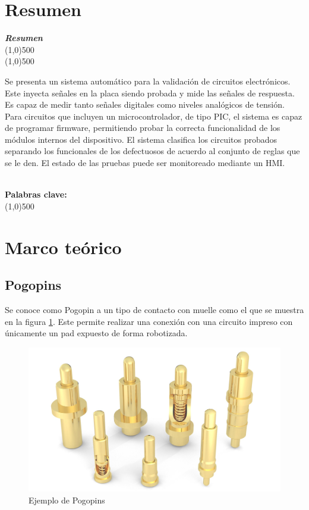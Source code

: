 \documentclass[12pt,letterpaper]{article}     %
\makeatletter
\newcounter{resumen}
\newenvironment{resumen}
{	
	\begin{center}
	\begin{minipage}[t]{500 pt}
	\vspace{5mm}
	\emph{\textbf{Resumen}}
	\\[-2mm]
	\line(1,0){500}
	\\[-4.25 mm]
	\line(1,0){500}
	\vspace{\baselineskip}
}
{
	\normalsize
	\\[2mm]
	\footnotesize\textbf{Palabras clave: \footnotesize\@palabras}
	\\[-2mm]
	\line(1,0){500}
	\\[0.5cm]
	\end{minipage}
	\end{center}
}
\makeatother
\begin{document}
\newpage
\section{Resumen}
\begin{resumen}
	Se presenta un sistema automático para la validación de circuitos electrónicos.
	Este inyecta señales en la placa siendo probada y mide las señales de respuesta.
	Es capaz de medir tanto señales digitales como niveles analógicos de tensión.
	Para circuitos que incluyen un microcontrolador, de tipo PIC, el sistema es capaz de programar
	firmware, permitiendo probar la correcta funcionalidad de los módulos internos
	del dispositivo. El sistema clasifica los circuitos probados separando los
	funcionales de los defectuosos de acuerdo al conjunto de reglas que se le den.
	El estado de las pruebas puede ser monitoreado mediante un HMI.
\end{resumen} 
% 
\section{Marco teórico}
\label{Marco teórico}

\subsection{Pogopins}

Se conoce como Pogopin a un tipo de contacto con muelle como el que se muestra en la figura \ref{fig:pogopin}.
Este permite realizar una conexión con una circuito impreso con únicamente un pad expuesto de forma robotizada.

\begin{figure}[!ht]
\centering
\includegraphics[]{imagenes/pogopin.jpg}
\caption{Ejemplo de Pogopins}
\label{fig:pogopin}
\end{figure}
\end{document}
